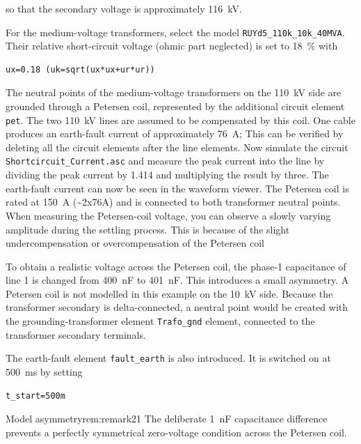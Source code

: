 so that the secondary voltage is approximately \SI{116}{\kilo\volt}.

For the medium-voltage transformers, select the model
\texttt{RUYd5\_110k\_10k\_40MVA}. Their relative short-circuit voltage (ohmic part neglected) is set
to \SI{18}{\percent} with

\begin{lstlisting}[style=LTspice]
ux=0.18 (uk=sqrt(ux*ux+ur*ur))
\end{lstlisting}

The neutral points of the medium-voltage transformers on the \SI{110}{\kilo\volt} side are grounded through a Petersen coil, represented by the additional circuit element \texttt{pet}. The
two \SI{110}{\kilo\volt} lines are assumed to be compensated by this coil. One
cable produces an earth-fault current of approximately \SI{76}{\ampere}; 
This can be verified by deleting all the circuit elements after the line elements.
Now simulate the circuit \texttt{Shortcircuit\_Current.asc} and measure the peak current into the line by dividing the peak current by 1.414 and multiplying the result by three. The earth-fault current
can now be seen in the waveform viewer. %
The Petersen coil is rated at \SI{150}{\ampere} (\textasciitilde 2x76A) and is connected to both
transformer neutral points. When measuring the Petersen-coil voltage, you can observe a slowly varying amplitude during the settling process. This is because of the slight undercompensation or overcompensation of the Petersen coil

To obtain a realistic voltage across the Petersen coil, the phase-1
capacitance of line 1 is changed from \SI{400}{\nano\farad} to
\SI{401}{\nano\farad}. This introduces a small asymmetry. A Petersen coil is not modelled in this example on the \SI{10}{\kilo\volt} side. Because the transformer secondary
is delta-connected, a neutral point would be created with the grounding-transformer element
\texttt{Trafo\_gnd} element, connected to the transformer secondary terminals.

The earth-fault element \texttt{fault\_earth} is also introduced. It is
switched on at \SI{500}{\milli\second} by setting

\begin{lstlisting}[style=LTspice]
t_start=500m
\end{lstlisting}

\begin{remark}{Model asymmetry}{rem:remark21}
The deliberate \SI{1}{\nano\farad} capacitance difference prevents a perfectly
symmetrical zero-voltage condition across the Petersen coil.
\end{remark}

